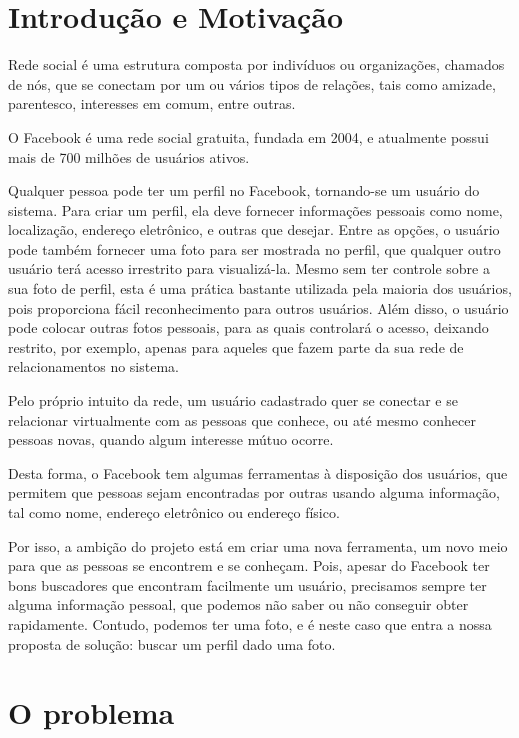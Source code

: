 \documentclass[10pt,a4paper]{article}
\begin{document}
\tableofcontents
\newpage 

\section{Introdução e Motivação}

	Rede social é uma estrutura composta por indivíduos ou organizações, chamados de nós, que se conectam por um ou vários tipos de relações, tais como amizade, parentesco, interesses em comum, entre outras.
	
	O Facebook é uma rede social gratuita, fundada em 2004, e atualmente possui mais de 700 milhões de usuários ativos.

	Qualquer pessoa pode ter um perfil no Facebook, tornando-se um usuário do sistema. Para criar um perfil, ela deve fornecer informações pessoais como nome, localização, endereço eletrônico, e outras que desejar. Entre as opções, o usuário pode também fornecer uma foto para ser mostrada no perfil, que qualquer outro usuário terá acesso irrestrito para visualizá-la. Mesmo sem ter controle sobre a sua foto de perfil, esta é uma prática bastante utilizada pela maioria dos usuários, pois proporciona fácil reconhecimento para outros usuários. Além disso, o usuário pode colocar outras fotos pessoais, para as quais controlará o acesso, deixando restrito, por exemplo, apenas para aqueles que fazem parte da sua rede de relacionamentos no sistema.

	Pelo próprio intuito da rede, um usuário cadastrado quer se conectar e se relacionar virtualmente com as pessoas que conhece, ou até mesmo conhecer pessoas novas, quando algum interesse mútuo ocorre.

	Desta forma, o Facebook tem algumas ferramentas à disposição dos usuários, que permitem que pessoas sejam encontradas por outras usando alguma informação, tal como nome, endereço eletrônico ou endereço físico.

	Por isso, a ambição do projeto está em criar uma nova ferramenta, um novo meio para que as pessoas se encontrem e se conheçam. Pois, apesar do Facebook ter bons buscadores que encontram facilmente um usuário, precisamos sempre ter alguma informação pessoal, que podemos não saber ou não conseguir obter rapidamente. Contudo, podemos ter uma foto, e é neste caso que entra a nossa proposta de solução: buscar um perfil dado uma foto.
\section{O problema}
\end{document}
